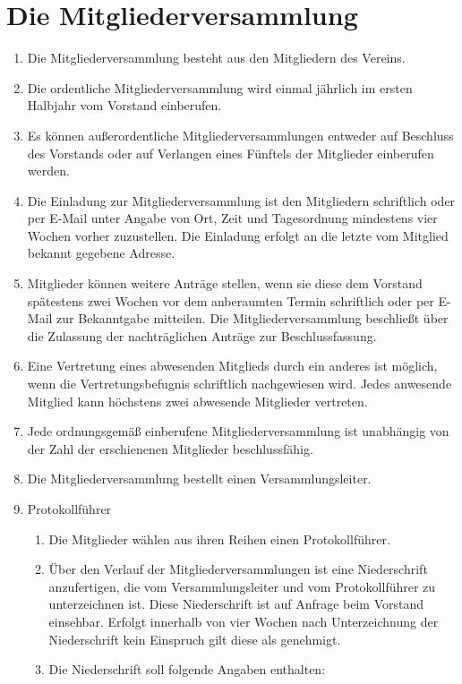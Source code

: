 \documentclass[a4paper, 12pt]{scrartcl}
\begin{document}
\section{Die Mitgliederversammlung}
\label{die-mv}
\begin{enumerate}
	\item Die Mitgliederversammlung besteht aus den Mitgliedern des Vereins.
	\item Die ordentliche Mitgliederversammlung wird einmal jährlich im ersten Halbjahr vom Vorstand einberufen.
	\item Es können außerordentliche Mitgliederversammlungen entweder auf Beschluss des Vorstands oder auf Verlangen eines Fünftels der Mitglieder einberufen werden.
	\item \label{mv-einladung} Die Einladung zur Mitgliederversammlung ist den Mitgliedern schriftlich oder per E-Mail unter Angabe von Ort, Zeit und Tagesordnung mindestens vier Wochen vorher zuzustellen. Die Einladung erfolgt an die letzte vom Mitglied bekannt gegebene Adresse.
	\item \label{mv-nachtrag} Mitglieder können weitere Anträge stellen, wenn sie diese dem Vorstand spätestens zwei Wochen vor dem anberaumten Termin schriftlich oder per E-Mail zur Bekanntgabe mitteilen. Die Mitgliederversammlung beschließt über die Zulassung der nachträglichen Anträge zur Beschlussfassung.
	\item Eine Vertretung eines abwesenden Mitglieds durch ein anderes ist möglich, wenn die Vertretungsbefugnis schriftlich nachgewiesen wird. Jedes anwesende Mitglied kann höchstens zwei abwesende Mitglieder vertreten.
	\item Jede ordnungsgemäß einberufene Mitgliederversammlung ist unabhängig von der Zahl der erschienenen Mitglieder beschlussfähig.
	\item Die Mitgliederversammlung bestellt einen Versammlungsleiter.
	\item{Protokollführer}
		\begin{enumerate}
			\item Die Mitglieder wählen aus ihren Reihen einen Protokollführer.
			\item Über den Verlauf der Mitgliederversammlungen ist eine Niederschrift anzufertigen, die vom Versammlungsleiter und vom Protokollführer zu unterzeichnen ist. Diese Niederschrift ist auf Anfrage beim Vorstand einsehbar. Erfolgt innerhalb von vier Wochen nach Unterzeichnung der Niederschrift kein Einspruch gilt diese als genehmigt.
			\item Die Niederschrift soll folgende Angaben enthalten:

\end{enumerate}
\end{enumerate}
\end{document}
